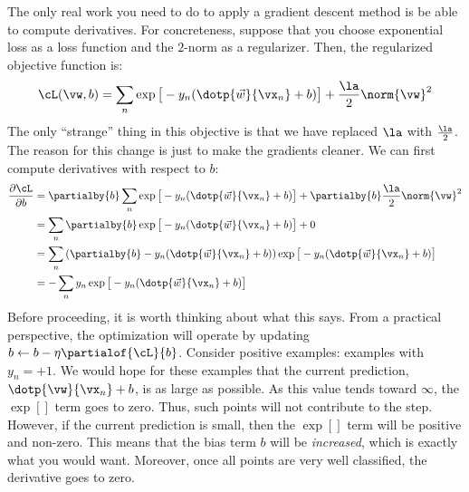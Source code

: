 The only real work you need to do to apply a gradient descent method
is be able to compute derivatives.  For concreteness, suppose that you
choose exponential loss as a loss function and the $2$-norm as a
regularizer.  Then, the regularized objective function is:
%
\begin{equation}
\cL(\vw,b) =
\sum_n
  \exp\big[-y_n (\dotp{\vec w}{\vx_n}+b)\big] +
 \frac \la 2 \norm{\vw}^2
\end{equation}
%
The only ``strange'' thing in this objective is that we have replaced
$\la$ with $\frac \la 2$.  The reason for this change is just to make
the gradients cleaner.  We can first compute derivatives with respect
to $b$:
%
\begin{align}
\frac {\partial\cL} {\partial b}
&= \partialby{b}\sum_n \exp\big[-y_n (\dotp{\vec w}{\vx_n}+b)\big] + \partialby{b}\frac \la 2 \norm{\vw}^2\\
&= \sum_n \partialby{b} \exp\big[ -y_n (\dotp{\vec w}{\vx_n}+b)\big] + 0\\
&= \sum_n \left( \partialby{b} -y_n (\dotp{\vec w}{\vx_n}+b) \right) \exp\big[ -y_n (\dotp{\vec w}{\vx_n}+b)\big]\\
&= - \sum_n y_n \exp\big[ -y_n (\dotp{\vec w}{\vx_n}+b)\big]
\end{align}
%
Before proceeding, it is worth thinking about what this says.  From a
practical perspective, the optimization will operate by updating $b
\leftarrow b - \eta \partialof{\cL}{b}$.  Consider positive examples:
examples with $y_n=+1$.  We would hope for these examples that the
current prediction, $\dotp{\vw}{\vx_n}+b$, is as large as possible.
As this value tends toward $\infty$, the $\exp[]$ term goes to
zero.  Thus, such points will not contribute to the step.  However, if
the current prediction is small, then the $\exp[]$ term will be
positive and non-zero.  This means that the bias term $b$ will be
\emph{increased}, which is exactly what you would want.  Moreover,
once all points are very well classified, the derivative goes to zero.


